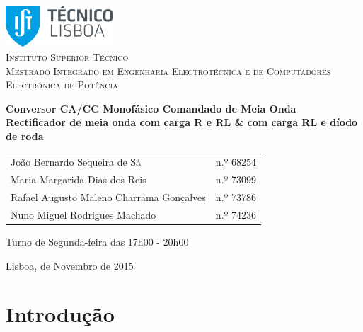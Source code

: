 \documentclass[a4paper,11pt]{article}
\numberwithin{equation}{section}
\begin{document}
\begin{titlepage}
\begin{center}

\hfill \break
\hfill \break

\includegraphics[width=0.3\textwidth]{img/logo}~\\[1cm] 

\textsc{\LARGE Instituto Superior Técnico}\\[0.25cm]
\textsc{\Large Mestrado Integrado em Engenharia Electrotécnica e de Computadores}\\[1.8cm]
\textsc{\huge Electrónica de Potência}\\[0.25cm]

\vspace{6mm}

{\huge \bfseries Conversor CA/CC Monofásico \linebreak Comandado de Meia Onda \\[0.7cm]}
{\bfseries Rectificador de meia onda com carga R e RL \& com carga RL e díodo de roda \\[1cm]}

\begin{tabular}{ l l }
	João Bernardo Sequeira de Sá & \hspace{2mm} n.º 68254 \\
	Maria Margarida Dias dos Reis & \hspace{2mm} n.º 73099 \\
	Rafael Augusto Maleno Charrama Gonçalves & \hspace{2mm} n.º 73786 \\
	Nuno Miguel Rodrigues Machado & \hspace{2mm} n.º 74236
\end{tabular}

\vspace{7mm}

Turno de Segunda-feira das 17h00 - 20h00

\vfill

{\large Lisboa,  de Novembro de 2015} 
	
\end{center}
\end{titlepage}
	
\tableofcontents
\pagebreak

\section{Introdução}
\end{document}
